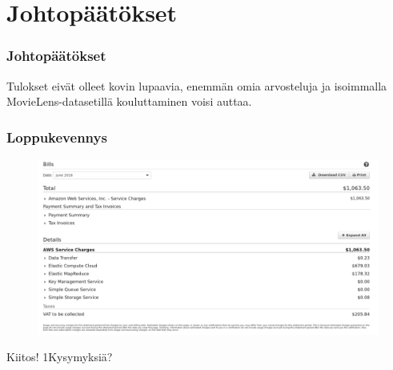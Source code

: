 \documentclass{beamer}
\begin{document}

\section{Johtopäätökset}

\begin{frame}
\frametitle{Johtopäätökset}

Tulokset eivät olleet kovin lupaavia, enemmän omia arvosteluja ja isoimmalla MovieLens-datasetillä kouluttaminen voisi auttaa.

\end{frame}


\begin{frame}
\frametitle{Loppukevennys}

\begin{figure}[h]
	\centering
	\includegraphics[scale=0.2]{../images/aws_bill}
\end{figure}

\end{frame}


\begin{frame}

Kiitos! 1Kysymyksiä?

\end{frame}

\end{document}
